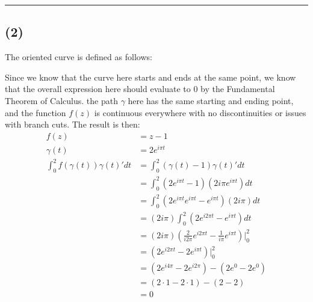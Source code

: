 \documentclass{article}
\begin{document}
\hrule
\newpage
\subsection*{(2)}
The oriented curve is defined as follows:
\begin{center}
\end{center}
Since we know that the curve here starts and ends at the same point, we know that the overall expression here should evaluate to 0 by the Fundamental Theorem of Calculus. the path $\gamma$
 here has the same starting and ending point, and the function $f(z)$ is continuous everywhere with no discontinuities or issues with branch cuts. The result is then:
\begin{align*}
  f(z) &= z-1 \\
  \gamma(t) &= 2e^{i\pi t}\\
  \int_0^{2}f(\gamma(t))\gamma(t)'dt &=  \int_0^{2}(\gamma(t)-1)\gamma(t)'dt \\
  &=  \int_0^{2}(2e^{i\pi t}-1)(2i\pi e^{i\pi t})dt \\
  &=  \int_0^{2}(2e^{i\pi t}e^{i\pi t}-e^{i\pi t})(2i\pi)dt \\
  &=  (2i\pi)\int_0^{2}(2e^{i2\pi t}-e^{i\pi t})dt \\
  &=  (2i\pi)\left(\frac{2}{i2\pi}e^{i2\pi t}-\frac{1}{i\pi}e^{i\pi t}\right)|_0^{2} \\
  &=  \left(2e^{i2\pi t}-2e^{i\pi t}\right)|_0^{2} \\
  &=  \left(2e^{i4\pi}-2e^{i2\pi}\right) - \left(2e^{0}-2e^{0}\right) \\
  &=  \left(2\cdot 1-2\cdot 1\right) - \left(2-2\right) \\
  &= 0
\end{align*}
\vspace{.5cm} %
\end{document}
